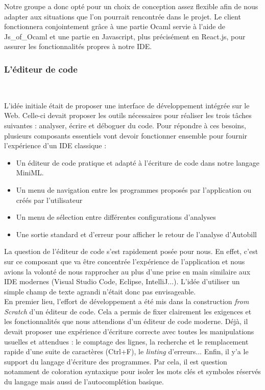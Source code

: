 \documentclass[12pt]{article}
\begin{document}
Notre groupe a donc opté pour un choix de conception assez flexible afin de nous adapter aux situations que l'on pourrait rencontrée dans le projet. Le client fonctionnera conjointement grâce à une partie Ocaml servie à l'aide de Js\_of\_Ocaml et une partie en Javascript, plus précisément en React.js, pour assurer les fonctionnalités propres à notre IDE.

\subsubsection{L'éditeur de code}\

L'idée initiale était de proposer une interface de développement intégrée sur le Web. Celle-ci devait proposer les outils nécessaires pour réaliser les trois tâches suivantes : analyser, écrire et déboguer du code. Pour répondre à ces besoins, plusieurs composants essentiels vont devoir fonctionner ensemble pour fournir l'expérience d'un IDE classique :
\begin{itemize}
      \item Un éditeur de code pratique et adapté à l'écriture de code dans notre langage MiniML.
      \item Un menu de navigation entre les programmes proposés par l'application ou créés par l'utilisateur
      \item Un menu de sélection entre différentes configurations d'analyses
      \item Une sortie standard et d'erreur pour afficher le retour de l'analyse d'Autobill \\
\end{itemize}

La question de l'éditeur de code s'est rapidement posée pour nous. En effet, c'est sur ce composant que va être concentrée l'expérience de l'application et nous avions la volonté de nous rapprocher au plus d'une prise en main similaire aux IDE modernes (Visual Studio Code, Eclipse, IntelliJ...). L'idée d'utiliser un simple champ de texte agrandi n'était donc pas envisageable. \\

En premier lieu, l'effort de développement a été mis dans la construction \textit{from Scratch} d'un éditeur de code. Cela a permis de fixer clairement les exigences et les fonctionnalités que nous attendions d'un éditeur de code moderne. Déjà, il devait proposer une expérience d'écriture correcte avec toutes les manipulations usuelles et attendues : le comptage des lignes, la recherche et le remplacement rapide d'une suite de caractères (Ctrl+F), le \textit{linting} d'erreurs... Enfin, il y'a le support du langage d'écriture des programmes. Par cela, il est question notamment de coloration syntaxique pour isoler les mots clés et symboles réservés du langage mais aussi de l'autocomplétion basique.  \\
\end{document}

